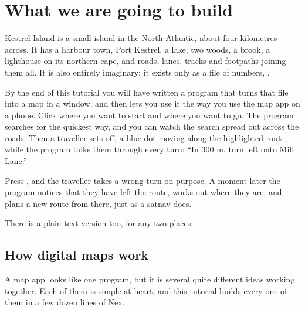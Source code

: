 \chapter{What we are going to build}

Kestrel Island is a small island in the North Atlantic, about four
kilometres across. It has a harbour town, Port Kestrel, a lake, two woods, a
brook, a lighthouse on its northern cape, and roads, lanes, tracks and
footpaths joining them all. It is also entirely imaginary: it exists only
as a file of numbers, .

By the end of this tutorial you will have written a program that turns that
file into a map in a window, and then lets you use it the way you use the
map app on a phone. Click where you want to start and where you want to go.
The program searches for the quickest way, and you can watch the search
spread out across the roads. Then a traveller sets off, a blue dot moving
along the highlighted route, while the program talks them through every
turn: ``In 300 m, turn left onto Mill Lane.''


Press , and the traveller takes a wrong turn on purpose. A moment
later the program notices that they have left the route, works out where
they are, and plans a new route from there, just as a satnav does.

There is a plain-text version too, for any two places:


\section{How digital maps work}

A map app looks like one program, but it is several quite different ideas
working together. Each of them is simple at heart, and this tutorial builds
every one of them in a few dozen lines of Nex.

